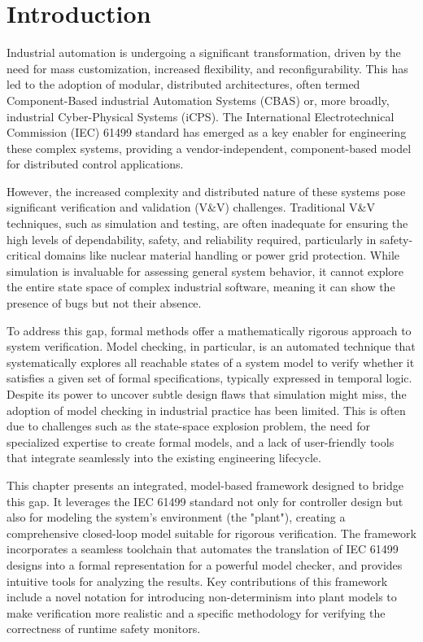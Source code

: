 \section{Introduction}

Industrial automation is undergoing a significant transformation, driven by the need for mass customization, increased flexibility, and reconfigurability. This has led to the adoption of modular, distributed architectures, often termed Component-Based industrial Automation Systems (CBAS) or, more broadly, industrial Cyber-Physical Systems (iCPS). The International Electrotechnical Commission (IEC) 61499 standard has emerged as a key enabler for engineering these complex systems, providing a vendor-independent, component-based model for distributed control applications.

However, the increased complexity and distributed nature of these systems pose significant verification and validation (V\&V) challenges. Traditional V\&V techniques, such as simulation and testing, are often inadequate for ensuring the high levels of dependability, safety, and reliability required, particularly in safety-critical domains like nuclear material handling or power grid protection. While simulation is invaluable for assessing general system behavior, it cannot explore the entire state space of complex industrial software, meaning it can show the presence of bugs but not their absence.

To address this gap, formal methods offer a mathematically rigorous approach to system verification. Model checking, in particular, is an automated technique that systematically explores all reachable states of a system model to verify whether it satisfies a given set of formal specifications, typically expressed in temporal logic. Despite its power to uncover subtle design flaws that simulation might miss, the adoption of model checking in industrial practice has been limited. This is often due to challenges such as the state-space explosion problem, the need for specialized expertise to create formal models, and a lack of user-friendly tools that integrate seamlessly into the existing engineering lifecycle.

This chapter presents an integrated, model-based framework designed to bridge this gap. It leverages the IEC 61499 standard not only for controller design but also for modeling the system's environment (the "plant"), creating a comprehensive closed-loop model suitable for rigorous verification. The framework incorporates a seamless toolchain that automates the translation of IEC 61499 designs into a formal representation for a powerful model checker, and provides intuitive tools for analyzing the results. Key contributions of this framework include a novel notation for introducing non-determinism into plant models to make verification more realistic and a specific methodology for verifying the correctness of runtime safety monitors.

